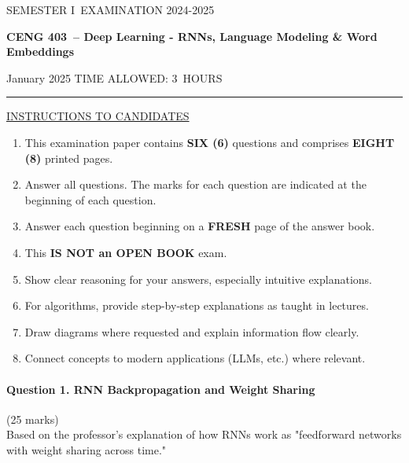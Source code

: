 \documentclass[12pt]{article}
\newcommand{\masunitnumber}{CENG 403}
\newcommand{\examdate}{January 2025}
\newcommand{\academicyear}{2024-2025}
\newcommand{\semester}{I}
\newcommand{\coursename}{Deep Learning - RNNs, Language Modeling \& Word Embeddings}
\newcommand{\numberofhours}{3}
\begin{document}
\setlength{\headsep}{5truemm}
\setlength{\headheight}{14.5truemm}
\setlength{\voffset}{-0.45truein}
\renewcommand{\headrulewidth}{0.0pt}
\begin{center}
SEMESTER \semester\ EXAMINATION \academicyear
\end{center}
\begin{center}
{\bf \masunitnumber\ -- \coursename}
\end{center}
\vspace{20truemm}
\noindent \examdate\hspace{45truemm} TIME ALLOWED: \numberofhours\ HOURS
\vspace{19truemm}
\hrule
\vspace{19truemm}
\noindent\underline{INSTRUCTIONS TO CANDIDATES}
\vspace{8truemm}
\begin{enumerate}
\item This examination paper contains {\bf SIX (6)} questions and comprises 
{\bf EIGHT (8)} printed pages.
\item Answer all questions. 
The marks for each question are indicated at the beginning of each question.
\item Answer each question beginning on a {\bf FRESH} page of the answer book.
\item This {\bf IS NOT an OPEN BOOK} exam.
\item Show clear reasoning for your answers, especially intuitive explanations.
\item For algorithms, provide step-by-step explanations as taught in lectures.
\item Draw diagrams where requested and explain information flow clearly.
\item Connect concepts to modern applications (LLMs, etc.) where relevant.
\end{enumerate}
\newpage
\lhead{}
\rhead{\masunitnumber}
\chead{}
\lfoot{}
\cfoot{\thepage}
\rfoot{}
\setlength{\footskip}{45pt}

\paragraph{Question 1. RNN Backpropagation and Weight Sharing}\hfill (25 marks)\\
Based on the professor's explanation of how RNNs work as "feedforward networks with weight sharing across time."
\end{document}
